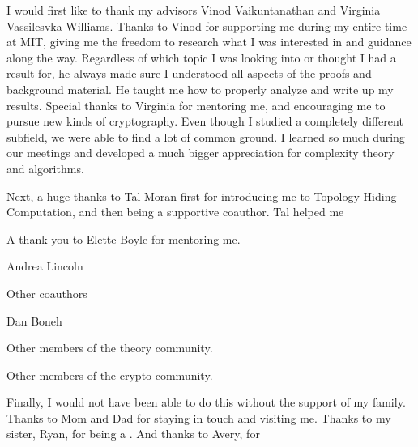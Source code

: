 
I would first like to thank my advisors Vinod Vaikuntanathan and Virginia Vassilesvka Williams. Thanks to Vinod for supporting me during my entire time at MIT, giving me the freedom to research what I was interested in and guidance along the way. Regardless of which topic I was looking into or thought I had a result for, he always made sure I understood all aspects of the proofs and background material. He taught me how to properly analyze and write up my results.
Special thanks to Virginia for mentoring me, and encouraging me to pursue new kinds of cryptography. Even though I studied a completely different subfield, we were able to find a lot of common ground. I learned so much during our meetings and developed a much bigger appreciation for complexity theory and algorithms.

Next, a huge thanks to Tal Moran first for introducing me to Topology-Hiding Computation, and then being a supportive coauthor. Tal helped me

A thank you to Elette Boyle for mentoring me.

Andrea Lincoln

Other coauthors

Dan Boneh

Other members of the theory community.

Other members of the crypto community.

Finally, I would not have been able to do this without the support of my family. Thanks to Mom and Dad for staying in touch and visiting me. Thanks to my sister, Ryan, for being a . And thanks to Avery, for
